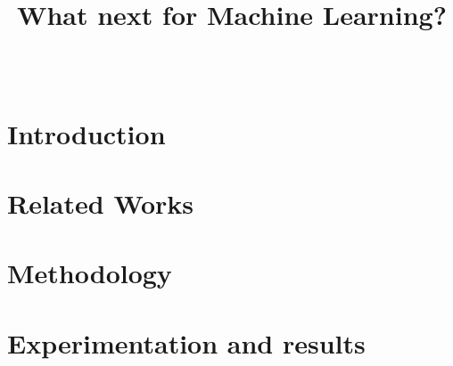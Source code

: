 \documentclass[10pt, a4paper, twocolumn]{article} %
\title{What next for Machine Learning?} %
\author{
	\authorstyle{Automating the automation} %
	\newline\newline %
	\keywords{V\'ictor Santiago Gon\'alez. D16128055}\\ %
}
\date{} %
\begin{document}
\maketitle %

\thispagestyle{firstpage} %



	\section{Introduction}

	


	\section{Related Works}

	


	\section{Methodology}

	


	\section{Experimentation and results}

	
\end{document}

